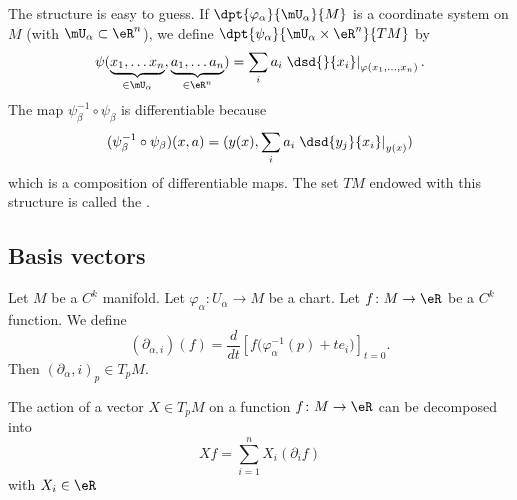 The structure is easy to guess. If $\dpt{\varphi_{\alpha}}{\mU_{\alpha}}{M}$ is a coordinate system on $M$ (with $\mU_{\alpha}\subset\eR^n$), we define $\dpt{\psi_{\alpha}}{\mU_{\alpha}\times \eR^n}{TM}$ by
\[
	\psi( \underbrace{x_1,\ldots x_n}_{\in\mU_{\alpha}},\underbrace{a_1,\ldots a_n}_{\in\eR^n}  )
	=\sum_i a_i\left.\dsd{}{x_i}\right|_{\varphi(x_1,\ldots,x_n)}.
\]
The map $\psi_{\beta}^{-1}\circ\psi_{\beta}$ is differentiable because
\[
	(\psi_{\beta}^{-1}\circ\psi_{\beta})(x,a)=( y(x),\sum_i a_i\left.\dsd{y_j}{x_i}\right|_{y(x)}  )
\]
which is a composition of differentiable maps. The set $TM$ endowed with this structure is called the .


\subsection{Basis vectors}

\begin{propositionDef}
	Let \( M\) be a \( C^k\) manifold. Let \(\varphi_{\alpha}\colon U_{\alpha} \to M  \) be a chart. Let \(f \colon M\to \eR  \) be a \( C^k\) function. We define
	\begin{equation}
		(\partial_{\alpha,i})(f)=\frac{d}{dt} \left[ f\big( \varphi_{\alpha}^{-1}(p)+te_i \big)  \right]_{t=0}.
	\end{equation}
	Then \( (\partial_\alpha, i)_p\in T_pM\).
\end{propositionDef}

\begin{lemma}       \label{LEMooXDESooHXzIJU}
	The action of a vector \( X\in T_pM\) on a function \( f\colon M\to \eR\) can be decomposed into
	\begin{equation}
		Xf=\sum_{i=1}^n X_i(\partial_if)
	\end{equation}
	with \( X_i\in\eR\)
\end{lemma}

